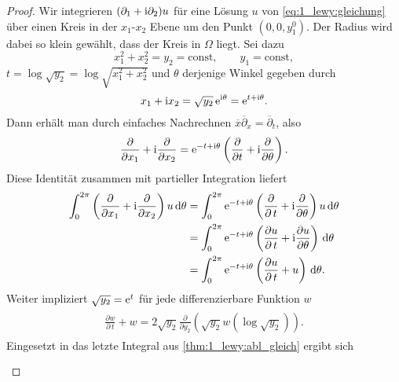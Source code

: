 \begin{proof}
Wir integrieren $(\partial_1+\mathrm i\partial_2) u$ für eine Lösung $u$ von \eqref{eq:1_lewy:gleichung} über einen Kreis in der $x_1$-$x_2$ Ebene um den Punkt $(0,0,y_1^0)$. Der Radius wird dabei so klein gewählt, dass der Kreis in $\Omega$ liegt. Sei dazu
\begin{equation}
x_1^2+x_2^2=y_2=\mathrm{const},\qquad y_1=\mathrm{const},
\end{equation}
$t=\log\sqrt{y_2}=\log\sqrt{x_1^2+x_2^2}$ und $\theta$ derjenige Winkel gegeben durch
\begin{equation}
x_1+\mathrm i x_2=\sqrt{y_2} \, \mathrm e^{\mathrm i\theta} =\mathrm e^{t+\mathrm i\theta}.
\end{equation}
Dann erhält man durch einfaches Nachrechnen $\overline x \overline\partial_x = \overline\partial_t$, also
\begin{equation}\label{thm:1_lewy:proof1}
\frac{\partial}{\partial x_1} +\mathrm i\frac{\partial}{\partial x_2}=
\mathrm e^{-t+\mathrm i\theta} \left(\frac{\partial}{\partial t}
+\mathrm i\frac{\partial}{\partial \theta}\right).
\end{equation}
Diese Identität zusammen mit partieller Integration liefert
\begin{align}\label{thm:1_lewy:abl_gleich}
\begin{split}
\int_0^{2\pi} \left(\frac{\partial}{\partial x_1} +\mathrm i\frac{\partial}{\partial x_2}\right)u\,\mathrm d\theta 
&= \int_0^{2\pi} \mathrm e^{-t+\mathrm i\theta} \left(\frac{\partial}{\partial \,t}+\mathrm i\frac{\partial}{\partial \theta}\right)u \,\mathrm d\theta \\
&= \int_0^{2\pi} \mathrm e^{-t+\mathrm i\theta} \left(\frac{\partial u}{\partial \,t} +\mathrm i\frac{\partial u}{\partial \theta}\right)\,\mathrm d\theta \\
&= \int_0^{2\pi} \mathrm e^{-t+\mathrm i\theta} \left(\frac{\partial u}{\partial \,t} +u\right)\,\mathrm d\theta .
\end{split}
\end{align}
Weiter impliziert $\sqrt{y_2}=\mathrm e^t$ für jede differenzierbare Funktion $w$
\begin{align}\label{thm:1_lewy:int_gleichheit1}
\begin{split}
\frac{\partial w}{\partial\, t}+ w  = 2\sqrt{y_2} \frac{\partial}{\partial y_2} \left( \sqrt{y_2} w(\log\sqrt{y_2})\right).
\end{split}
\end{align}
Eingesetzt in das letzte Integral aus \eqref{thm:1_lewy:abl_gleich} ergibt sich
\begin{align}\label{thm:1_lewy:abl_gleich_final}
\begin{split}

\end{split}
\end{align}
\end{proof}
